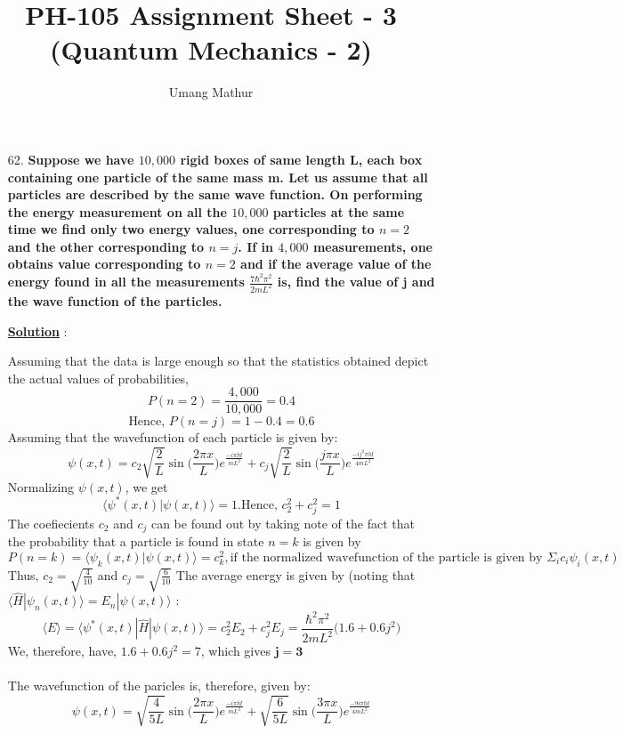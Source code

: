 \documentclass[10pt, a4paper]{article}
\begin{document}
	\title{PH-105 Assignment Sheet - 3 (Quantum Mechanics - 2)}
	\date{}
	\author{Umang Mathur}
	\maketitle
	\begin{enumerate}
		\item[62.] {\bf Suppose we have $10,000$ rigid boxes of same length L, each box containing one particle of the same mass m. Let us assume that all particles are described by the same wave function. On performing the energy measurement on all the $10,000$ particles at the same time we find only two energy values, one corresponding to $n = 2$ and the other corresponding to $n = j$. If in $4,000$ measurements, one obtains value corresponding to $n = 2$ and if the average value of the energy found in all the measurements $\frac{7\hbar^2\pi^2}{2mL^2}$ is, find the value of j and the wave function of the particles.}
			
		{\underline {\bf Solution}} :
		
		Assuming that the data is large enough so that the statistics obtained depict the actual values of probabilities,
		\[ P(n = 2) = \frac{4,000}{10,000} = 0.4\]
		\[ \text{Hence, } P(n = j) = 1 - 0.4 = 0.6\]
		Assuming that the wavefunction of each particle is given by:
		\[ \psi(x,t) = c_2\sqrt{\frac{2}{L}}\sin\big(\frac{2\pi x}{L}\big)e^{\frac{-i\pi ht}{mL^2}} + c_j\sqrt{\frac{2}{L}}\sin\big(\frac{j\pi x}{L}\big)e^{\frac{-ij^2\pi ht}{4mL^2}} \]
		Normalizing $\psi(x,t)$, we get
		\[ \langle \psi^*(x,t) | \psi(x,t) \rangle = 1 .\text{Hence, } c_2^2 + c_j^2 = 1 \]
		The coefiecients $c_2$ and $c_j$ can be found out by taking note of the fact that the probability that a particle is found in state $n = k$ is given by
		\[ P(n = k) = \langle \psi_k(x,t) | \psi(x,t) \rangle = c_k^2, \text{if the normalized wavefunction of the particle is given by } \Sigma_i c_i\psi_i(x,t) \]
		Thus, $c_2 = \sqrt{\frac{4}{10}}$ and $c_j = \sqrt{\frac{6}{10}}$
		The average energy is given by (noting that $\langle \hat{H} | \psi_n(x,t) \rangle = E_n | \psi(x,t) \rangle$ :
		\[ \langle E \rangle = \langle \psi^*(x,t) | \hat{H} | \psi(x,t) \rangle = c_2^2E_2 + c_j^2E_j = \frac{\hbar^2\pi^2}{2mL^2}\big(1.6 + 0.6j^2\big)\]
		We, therefore, have, $1.6 + 0.6j^2 = 7$, which gives $\mathbf{j = 3}$\\\\
		The wavefunction of the paricles is, therefore, given by:
		\[ \psi(x,t) = \sqrt{\frac{4}{5L}}\sin\big(\frac{2\pi x}{L}\big)e^{\frac{-i\pi ht}{mL^2}} + \sqrt{\frac{6}{5L}}\sin\big(\frac{3\pi x}{L}\big)e^{\frac{-9i\pi ht}{4mL^2}} \]
				
	\end{enumerate}
\end{document}
